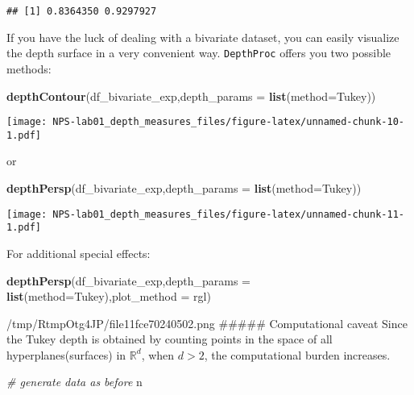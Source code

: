 \documentclass[
]{article}
\newenvironment{Shaded}{\begin{snugshade}}{\end{snugshade}}
\newcommand{\AttributeTok}[1]{\textcolor[rgb]{0.13,0.29,0.53}{#1}}
\newcommand{\CommentTok}[1]{\textcolor[rgb]{0.56,0.35,0.01}{\textit{#1}}}
\newcommand{\FunctionTok}[1]{\textcolor[rgb]{0.13,0.29,0.53}{\textbf{#1}}}
\newcommand{\NormalTok}[1]{#1}
\newcommand{\StringTok}[1]{\textcolor[rgb]{0.31,0.60,0.02}{#1}}
\begin{document}
\begin{verbatim}
## [1] 0.8364350 0.9297927
\end{verbatim}

If you have the luck of dealing with a bivariate dataset, you can easily
visualize the depth surface in a very convenient way. \texttt{DepthProc}
offers you two possible methods:

\begin{Shaded}
\begin{Highlighting}[]
\FunctionTok{depthContour}\NormalTok{(df\_bivariate\_exp,}\AttributeTok{depth\_params =} \FunctionTok{list}\NormalTok{(}\AttributeTok{method=}\StringTok{\textquotesingle{}Tukey\textquotesingle{}}\NormalTok{))}
\end{Highlighting}
\end{Shaded}

\texttt{[image: NPS-lab01\_depth\_measures\_files/figure-latex/unnamed-chunk-10-1.pdf]}

or

\begin{Shaded}
\begin{Highlighting}[]
\FunctionTok{depthPersp}\NormalTok{(df\_bivariate\_exp,}\AttributeTok{depth\_params =} \FunctionTok{list}\NormalTok{(}\AttributeTok{method=}\StringTok{\textquotesingle{}Tukey\textquotesingle{}}\NormalTok{))}
\end{Highlighting}
\end{Shaded}

\texttt{[image: NPS-lab01\_depth\_measures\_files/figure-latex/unnamed-chunk-11-1.pdf]}

For additional special effects:

\begin{Shaded}
\begin{Highlighting}[]
\FunctionTok{depthPersp}\NormalTok{(df\_bivariate\_exp,}\AttributeTok{depth\_params =} \FunctionTok{list}\NormalTok{(}\AttributeTok{method=}\StringTok{\textquotesingle{}Tukey\textquotesingle{}}\NormalTok{),}\AttributeTok{plot\_method =} \StringTok{\textquotesingle{}rgl\textquotesingle{}}\NormalTok{)}
\end{Highlighting}
\end{Shaded}

/tmp/RtmpOtg4JP/file11fce70240502.png \#\#\#\#\# Computational caveat
Since the Tukey depth is obtained by counting points in the space of all
hyperplanes(surfaces) in \(\mathbb{R}^d\), when \(d>2\), the
computational burden increases.

\begin{Shaded}
\begin{Highlighting}[]
\CommentTok{\# generate data as before}
\NormalTok{n }
\end{Highlighting}
\end{Shaded}
\end{document}
